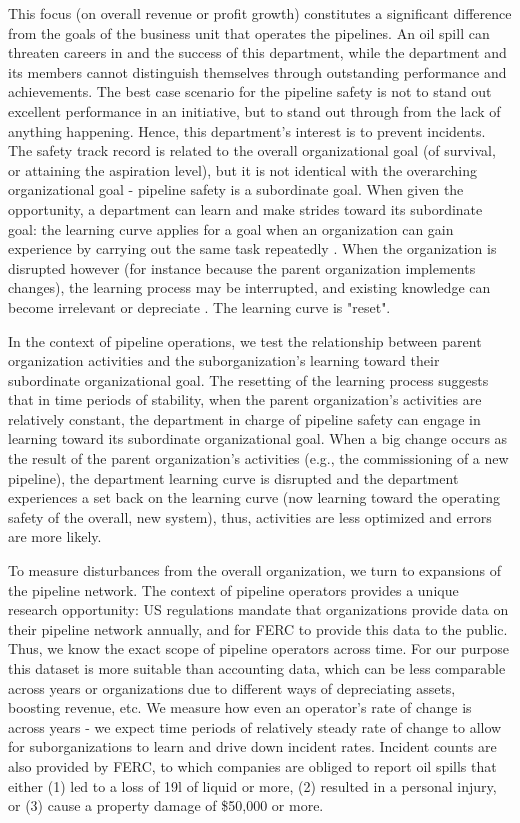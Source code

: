 This focus (on overall revenue or profit growth) constitutes a significant difference from the goals of the business unit that operates the pipelines. An oil spill can threaten careers in and the success of this department, while the department and its members cannot distinguish themselves through outstanding performance and achievements. The best case scenario for the pipeline safety is not to stand out excellent performance in an initiative, but to stand out through from the lack of anything happening. Hence, this department's interest is to prevent incidents. The safety track record is related to the overall organizational goal (of survival, or attaining the aspiration level), but it is not identical with the overarching organizational goal - pipeline safety is a subordinate goal. When given the opportunity, a department can learn and make strides toward its subordinate goal: the learning curve applies for a goal when an organization can gain experience by carrying out the same task repeatedly \citep{Argote2013_1}. When the organization is disrupted however (for instance because the parent organization implements changes), the learning process may be interrupted, and existing knowledge can become irrelevant or depreciate \citep[pp. 62 ff.]{Argote2013_3}. The learning curve is "reset".

In the context of pipeline operations, we test the relationship between parent organization activities and the suborganization's learning toward their subordinate organizational goal. The resetting of the learning process suggests that in time periods of stability, when the parent organization's activities are relatively constant, the department in charge of pipeline safety can engage in learning toward its subordinate organizational goal. When a big change occurs as the result of the parent organization's activities (e.g., the commissioning of a new pipeline), the department learning curve is disrupted and the department experiences a set back on the learning curve (now learning toward the operating safety of the overall, new system), thus, activities are less optimized and errors are more likely.

To measure disturbances from the overall organization, we turn to expansions of the pipeline network. The context of pipeline operators provides a unique research opportunity: US regulations mandate that organizations provide data on their pipeline network annually, and for FERC to provide this data to the public. Thus, we know the exact scope of pipeline operators across time. For our purpose this dataset is more suitable than accounting data, which can be less comparable across years or organizations due to different ways of depreciating assets, boosting revenue, etc. We measure how even an operator's rate of change is across years - we expect time periods of relatively steady rate of change to allow for suborganizations to learn and drive down incident rates. Incident counts are also provided by FERC, to which companies are obliged to report oil spills that either (1) led to a loss of 19l of liquid or more, (2) resulted in a personal injury, or (3) cause a property damage of \$50,000 or more.